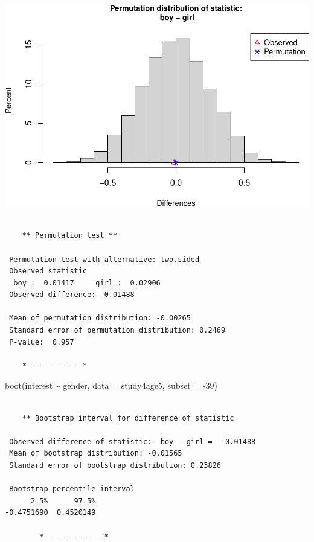 \documentclass[
]{book}
\newenvironment{Shaded}{\begin{snugshade}}{\end{snugshade}}
\newcommand{\AttributeTok}[1]{\textcolor[rgb]{0.77,0.63,0.00}{#1}}
\newcommand{\DecValTok}[1]{\textcolor[rgb]{0.00,0.00,0.81}{#1}}
\newcommand{\FunctionTok}[1]{\textcolor[rgb]{0.00,0.00,0.00}{#1}}
\newcommand{\NormalTok}[1]{#1}
\newcommand{\SpecialCharTok}[1]{\textcolor[rgb]{0.00,0.00,0.00}{#1}}
\begin{document}
\includegraphics[width=1\linewidth]{Class_Activity_13_files/figure-latex/unnamed-chunk-13-1}

\begin{verbatim}

    ** Permutation test **

 Permutation test with alternative: two.sided 
 Observed statistic
  boy :  0.01417     girl :  0.02906 
 Observed difference: -0.01488 

 Mean of permutation distribution: -0.00265 
 Standard error of permutation distribution: 0.2469 
 P-value:  0.957 

    *-------------*
\end{verbatim}

\begin{Shaded}
\begin{Highlighting}[]
\FunctionTok{boot}\NormalTok{(interest }\SpecialCharTok{\textasciitilde{}}\NormalTok{ gender, }\AttributeTok{data =}\NormalTok{ study4age5, }\AttributeTok{subset =} \SpecialCharTok{{-}}\DecValTok{39}\NormalTok{)}
\end{Highlighting}
\end{Shaded}

\begin{verbatim}

    ** Bootstrap interval for difference of statistic

 Observed difference of statistic:  boy - girl =  -0.01488 
 Mean of bootstrap distribution: -0.01565 
 Standard error of bootstrap distribution: 0.23826 

 Bootstrap percentile interval
      2.5%      97.5% 
-0.4751690  0.4520149 

        *--------------*
\end{verbatim}
\end{document}
